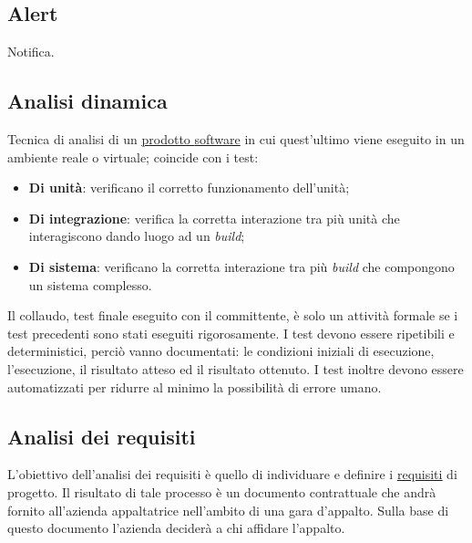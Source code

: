 





\copertina


\tableofcontents


	\newpage	


	\subsection{Alert}
	\label{sec:alter}
	Notifica.


	\subsection{Analisi dinamica}
	\label{sec:analisidinamica}
	Tecnica di analisi di un \underline{\hyperref[sec:prodottosoftware]prodotto {software}} in cui quest'ultimo viene eseguito in un ambiente reale o virtuale; coincide con i test:
	\begin{itemize}
		\item \textbf{Di unità}: verificano il corretto funzionamento dell'unità;
		\item \textbf{Di integrazione}: verifica la corretta interazione tra più unità che interagiscono dando luogo ad un \emph{build};
		\item \textbf{Di sistema}: verificano la corretta interazione tra più \emph{build} che compongono un sistema complesso.
	\end{itemize}
	Il collaudo, test finale eseguito con il committente, è solo un attività formale se i test precedenti sono stati eseguiti rigorosamente. I test devono essere ripetibili e deterministici, perciò vanno documentati: le condizioni iniziali di esecuzione, l'esecuzione, il risultato atteso ed il risultato ottenuto. I test inoltre devono essere automatizzati per ridurre al minimo la possibilità di errore umano.


	\subsection{Analisi dei requisiti}
	\label{sec:analisirequisiti}
	L'obiettivo dell'analisi dei requisiti è quello di individuare e definire i \underline{\hyperref[sec:requisito]{requisiti}} di progetto. Il risultato di tale processo è un documento contrattuale che andrà fornito all'azienda appaltatrice nell'ambito di una gara d'appalto. Sulla base di questo documento l'azienda deciderà a chi affidare l'appalto.


